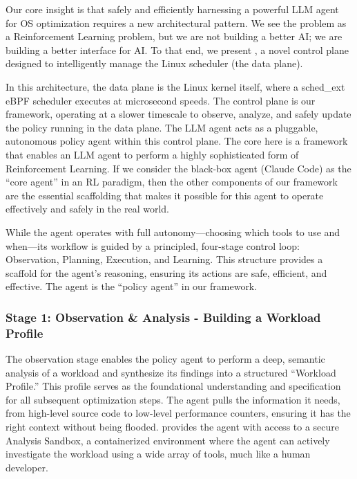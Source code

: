 Our core insight is that safely and efficiently harnessing a powerful LLM agent for OS optimization requires a new architectural pattern. We see the problem as a Reinforcement Learning problem, but we are not building a better AI; we are building a better interface for AI. To that end, we present \sys, a novel control plane designed to intelligently manage the Linux scheduler (the data plane).

In this architecture, the data plane is the Linux kernel itself, where a sched\_ext eBPF scheduler executes at microsecond speeds. The control plane is our framework, operating at a slower timescale to observe, analyze, and safely update the policy running in the data plane. The LLM agent acts as a pluggable, autonomous policy agent within this control plane. The core here is a framework that enables an LLM agent to perform a highly sophisticated form of Reinforcement Learning. If we consider the black-box agent (Claude Code) as the ``core agent'' in an RL paradigm, then the other components of our framework are the essential scaffolding that makes it possible for this agent to operate effectively and safely in the real world.

While the agent operates with full autonomy—choosing which tools to use and when—its workflow is guided by a principled, four-stage control loop: Observation, Planning, Execution, and Learning. This structure provides a scaffold for the agent's reasoning, ensuring its actions are safe, efficient, and effective. The agent is the ``policy agent'' in our framework.

\subsubsection{Stage 1: Observation \& Analysis - Building a Workload Profile}

The observation stage enables the policy agent to perform a deep, semantic analysis of a workload and synthesize its findings into a structured ``Workload Profile.'' This profile serves as the foundational understanding and specification for all subsequent optimization steps. The agent pulls the information it needs, from high-level source code to low-level performance counters, ensuring it has the right context without being flooded. \sys provides the agent with access to a secure Analysis Sandbox, a containerized environment where the agent can actively investigate the workload using a wide array of tools, much like a human developer.


